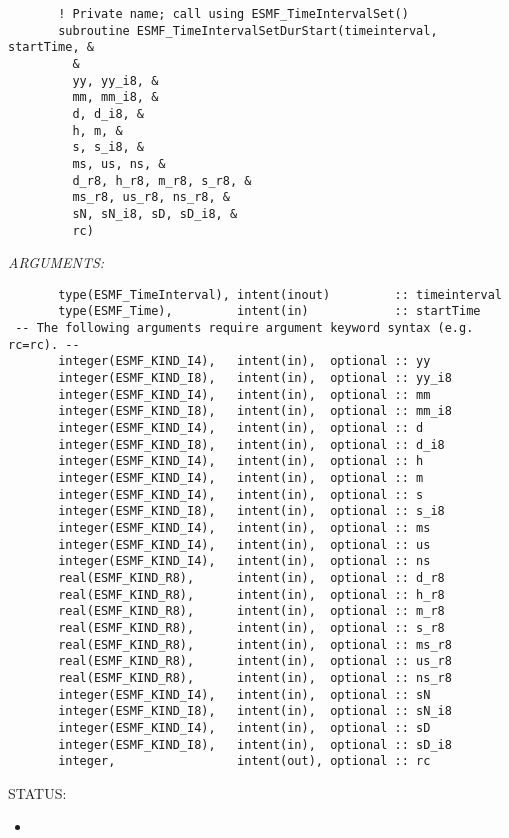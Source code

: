  
\begin{verbatim}       ! Private name; call using ESMF_TimeIntervalSet()
       subroutine ESMF_TimeIntervalSetDurStart(timeinterval, startTime, &
         &
         yy, yy_i8, &
         mm, mm_i8, &
         d, d_i8, &
         h, m, &
         s, s_i8, &
         ms, us, ns, &
         d_r8, h_r8, m_r8, s_r8, &
         ms_r8, us_r8, ns_r8, &
         sN, sN_i8, sD, sD_i8, &
         rc)
 \end{verbatim}{\em ARGUMENTS:}
\begin{verbatim}       type(ESMF_TimeInterval), intent(inout)         :: timeinterval
       type(ESMF_Time),         intent(in)            :: startTime
 -- The following arguments require argument keyword syntax (e.g. rc=rc). --
       integer(ESMF_KIND_I4),   intent(in),  optional :: yy
       integer(ESMF_KIND_I8),   intent(in),  optional :: yy_i8
       integer(ESMF_KIND_I4),   intent(in),  optional :: mm
       integer(ESMF_KIND_I8),   intent(in),  optional :: mm_i8
       integer(ESMF_KIND_I4),   intent(in),  optional :: d
       integer(ESMF_KIND_I8),   intent(in),  optional :: d_i8
       integer(ESMF_KIND_I4),   intent(in),  optional :: h
       integer(ESMF_KIND_I4),   intent(in),  optional :: m
       integer(ESMF_KIND_I4),   intent(in),  optional :: s
       integer(ESMF_KIND_I8),   intent(in),  optional :: s_i8
       integer(ESMF_KIND_I4),   intent(in),  optional :: ms
       integer(ESMF_KIND_I4),   intent(in),  optional :: us
       integer(ESMF_KIND_I4),   intent(in),  optional :: ns
       real(ESMF_KIND_R8),      intent(in),  optional :: d_r8
       real(ESMF_KIND_R8),      intent(in),  optional :: h_r8
       real(ESMF_KIND_R8),      intent(in),  optional :: m_r8
       real(ESMF_KIND_R8),      intent(in),  optional :: s_r8
       real(ESMF_KIND_R8),      intent(in),  optional :: ms_r8
       real(ESMF_KIND_R8),      intent(in),  optional :: us_r8
       real(ESMF_KIND_R8),      intent(in),  optional :: ns_r8
       integer(ESMF_KIND_I4),   intent(in),  optional :: sN
       integer(ESMF_KIND_I8),   intent(in),  optional :: sN_i8
       integer(ESMF_KIND_I4),   intent(in),  optional :: sD
       integer(ESMF_KIND_I8),   intent(in),  optional :: sD_i8
       integer,                 intent(out), optional :: rc
 \end{verbatim}
{\sf STATUS:}
   \begin{itemize}
   \item{}
   \end{itemize}
  
